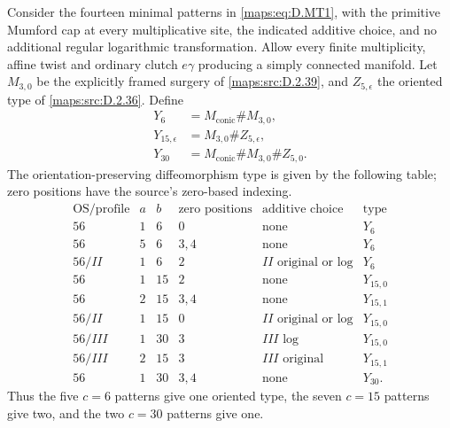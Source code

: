 \begin{theorem}
Consider the fourteen minimal patterns in \eqref{maps:eq:D.MT1}, with the primitive
Mumford cap at every multiplicative site, the indicated additive
choice, and no additional regular logarithmic transformation.
Allow every finite multiplicity, affine twist and ordinary clutch
$e\gamma$ producing a simply connected manifold. Let
$M_{3,0}$ be the explicitly framed surgery of \ref{maps:src:D.2.39}, and
$Z_{5,\epsilon}$ the oriented type of \ref{maps:src:D.2.36}. Define
\[
\begin{aligned}
 Y_6&=M_{\mathrm{conic}}\# M_{3,0},\\
 Y_{15,\epsilon}&=M_{3,0}\# Z_{5,\epsilon},\\
 Y_{30}&=M_{\mathrm{conic}}\# M_{3,0}\# Z_{5,0}.
\end{aligned}
\]
The orientation-preserving diffeomorphism type is given by the
following table; zero positions have the source's zero-based indexing.
\[
\begin{array}{c|r|r|l|l|l}
\text{OS/profile}&a&b&\text{zero positions}&\text{additive choice}&\text{type}\\\hline
56&1&6&0&\text{none}&Y_6\\
56&5&6&3,4&\text{none}&Y_6\\
56/II&1&6&2&II\text{ original or log}&Y_6\\
56&1&15&2&\text{none}&Y_{15,0}\\
56&2&15&3,4&\text{none}&Y_{15,1}\\
56/II&1&15&0&II\text{ original or log}&Y_{15,0}\\
56/III&1&30&3&III\text{ log}&Y_{15,0}\\
56/III&2&15&3&III\text{ original}&Y_{15,1}\\
56&1&30&3,4&\text{none}&Y_{30}.
\end{array}                                               \tag{D.MT1}\label{maps:eq:D.MT1}
\]
Thus the five $c=6$ patterns give one oriented type, the seven
$c=15$ patterns give two, and the two $c=30$ patterns give one.

\end{theorem}


